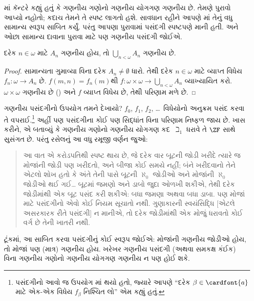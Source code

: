 \begin{ex}
\citeyear{Cantor1878}માં કૅન્ટરે કહ્યું
હતું કે ગણનીય ગણોનો ગણનીય યોગગણ
ગણનીય છે. તેમણે પુરાવો આપ્યો નહોતો;
કદાચ તેમને તે સ્પષ્ટ લાગતો હશે.
સાવધાન રહીને આપણે
માં
તેનું વધુ સામાન્ય સ્વરૂપ સાબિત કર્યું.
પરંતુ આપણા પુરાવામાં પસંદગી સ્પષ્ટપણે
માની હતી. અને ઓછા સામાન્ય દાવાના
પુરાવા માટે પણ ગણનીય પસંદગી જોઈએ.

\begin{thm}
દરેક $n \in \omega$ માટે $A_n$ ગણનીય
હોય, તો $\bigcup_{n <
\omega} A_n$ ગણનીય છે.
\end{thm}

\begin{proof}
સામાન્યતા ગુમાવ્યા વિના દરેક
$A_n \neq \emptyset$ ધારો. તેથી દરેક
$n \in \omega$ માટે વ્યાપ્ત વિધેય
$f_n \colon \omega \to A_n$ છે.
$f(m, n) = f_n(m)$થી
$f \colon \omega \times \omega \to
\bigcup_{n < \omega} A_n$
વ્યાખ્યાયિત કરો. $\omega \times \omega$
ગણનીય છે
()
અને $f$ વ્યાપ્ત વિધેય છે,
તેથી પરિણામ મળે છે.
\end{proof}
\noindent
ગણનીય પસંદગીનો ઉપયોગ તમને દેખાયો?
$f_0$, $f_1$, $f_2$, \dots\ વિધેયોનો અનુક્રમ
પસંદ કરવા તે વપરાઈ.\footnote{પસંદગીનો
આવો જ ઉપયોગ
માં
થયો હતો, જ્યારે આપણે ``દરેક
$\beta \in \cardfont{a}$ માટે
એક-એક વિધેય $f_\beta$ નિશ્ચિત લો''
એમ કહ્યું હતું.} અહીં પણ પસંદગીના
કોઈ પણ સિદ્ધાંત વિના પરિણામ નિષ્ફળ
જાય છે. ખાસ કરીને,
\citet{FefermanLevy1963}એ બતાવ્યું કે
ગણનીય ગણોનો ગણનીય યોગગણ
કદ~$\beth_1$ ધરાવે તે $\ZF$ સાથે
સુસંગત છે. પરંતુ રસેલનું આ વધુ રમૂજી
વર્ણન જુઓ:
\begin{quote}
  આ વાત એ કરોડપતિથી સ્પષ્ટ થાય છે, જે
  દરેક વાર બૂટની જોડી ખરીદે ત્યારે જ
  મોજાંની જોડી પણ ખરીદતો, અને બીજા
  કોઈ સમયે નહીં; બંને ખરીદવાનો તેને
  એટલો શોખ હતો કે અંતે તેની પાસે
  બૂટની $\aleph_0$ જોડીઓ અને મોજાંની
  $\aleph_0$ જોડીઓ થઈ ગઈ\dots\@
  બૂટમાં જમણો અને ડાબો જુદા ઓળખી શકીએ,
  તેથી દરેક જોડીમાંથી એક બૂટ પસંદ કરી
  શકીએ: બધા જમણા અથવા બધા ડાબા.
  પણ મોજાં માટે પસંદગીનો એવો કોઈ
  નિયમ સૂચાતો નથી. ગુણાકારની સ્વયંસિદ્ધિ
  [એટલે અસરકારક રીતે પસંદગી] ન માનીએ,
  તો દરેક જોડીમાંથી એક મોજું ધરાવતો
  કોઈ વર્ગ છે તેની ખાતરી નથી.
  \citep[p.~126]{Russell1919}
\end{quote}
ટૂંકમાં, આ સાબિત કરવા પસંદગીનું કોઈ
સ્વરૂપ જોઈએ: મોજાંની ગણનીય જોડીઓ હોય,
તો મોજાં પણ (માત્ર) ગણનીય હોય.
ખરેખર ગણનીય પસંદગી (અથવા સમકક્ષ
કંઈક) વિના ગણનીય ગણોનો ગણનીય
યોગગણ ગણનીય ન પણ હોઈ શકે.
\end{ex}

